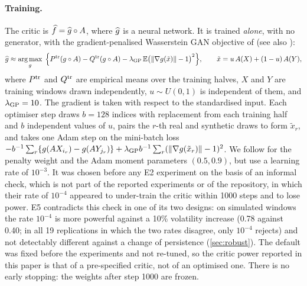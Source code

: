 \paragraph{Training.}
The critic is $\widehat{f}=\widehat{g}\circ A$, where $\widehat{g}$ is a neural network. It is trained \emph{alone},
with no generator, with the gradient-penalised Wasserstein GAN objective of
\citet{gulrajani2017improved} (see also \citealp{arjovsky2017wasserstein}):
\begin{equation}\label{eq:wgan-gp}
  \widehat{g}\approx\operatorname*{arg\,max}_{g}\;\Big\{P^{\mathrm{tr}}(g\circ A)-Q^{\mathrm{tr}}(g\circ A)
  -\lambda_{\mathrm{GP}}\,\mathbb{E}\big(\lVert\nabla g(\tilde x)\rVert-1\big)^2\Big\},\qquad
  \tilde x=u\,A(X)+(1-u)\,A(Y),
\end{equation}
where $P^{\mathrm{tr}}$ and $Q^{\mathrm{tr}}$ are empirical means over the training halves, $X$ and $Y$ are training
windows drawn independently, $u\sim U(0,1)$ is independent of them, and $\lambda_{\mathrm{GP}}=10$. The gradient
is taken with respect to the standardised input. Each optimiser step draws $b=128$ indices with
replacement from each training half and $b$ independent values of $u$, pairs the $r$-th real
and synthetic draws to form $\tilde x_r$, and takes one Adam step \citep{kingma_2015_adam} on
the mini-batch loss
$-b^{-1}\sum_{r}\{g(A X_{i_r})-g(A Y_{j_r})\}+\lambda_{\mathrm{GP}} b^{-1}\sum_r(\lVert\nabla g(\tilde x_r)\rVert-1)^2$.
We follow \citet{gulrajani2017improved} for the penalty weight and the Adam moment parameters
$(0.5,0.9)$, but use a learning rate of $10^{-3}$. It was chosen before any E2 experiment on the
basis of an informal check, which is not part of the reported experiments or of the repository,
in which their rate of $10^{-4}$ appeared to under-train the critic within 1000 steps and to lose
power. E5 contradicts this check in one of its two designs: on simulated windows the rate
$10^{-4}$ is more powerful against a 10\% volatility increase (0.78 against 0.40; in all 19
replications in which the two rates disagree, only $10^{-4}$ rejects) and not detectably
different against a change of persistence (\cref{sec:robust}). The default was fixed before the experiments and not
re-tuned, so the critic power reported in this paper is that of a pre-specified critic, not of an
optimised one. There is no early stopping: the weights after step 1000 are frozen.

